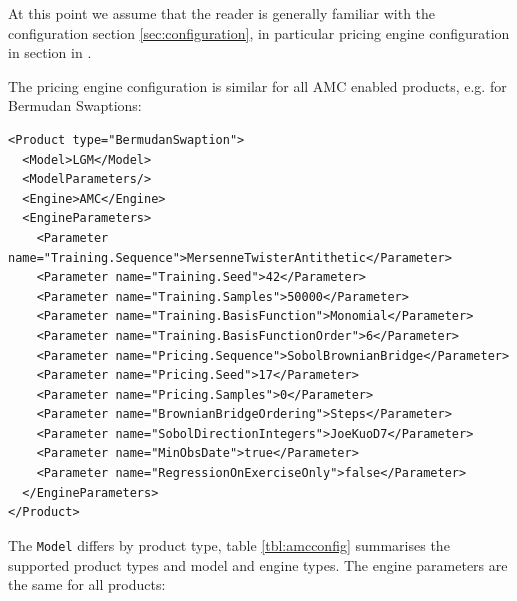 At this point we assume that the reader is generally familiar with the configuration section
\ref{sec:configuration}, in particular pricing engine configuration in section in \cite{products}.

The pricing engine configuration is similar for all AMC enabled products, e.g. for Bermudan Swaptions:

\begin{verbatim}
<Product type="BermudanSwaption">
  <Model>LGM</Model>
  <ModelParameters/>
  <Engine>AMC</Engine>
  <EngineParameters>
    <Parameter name="Training.Sequence">MersenneTwisterAntithetic</Parameter>
    <Parameter name="Training.Seed">42</Parameter>
    <Parameter name="Training.Samples">50000</Parameter>
    <Parameter name="Training.BasisFunction">Monomial</Parameter>
    <Parameter name="Training.BasisFunctionOrder">6</Parameter>
    <Parameter name="Pricing.Sequence">SobolBrownianBridge</Parameter>
    <Parameter name="Pricing.Seed">17</Parameter>
    <Parameter name="Pricing.Samples">0</Parameter>
    <Parameter name="BrownianBridgeOrdering">Steps</Parameter>
    <Parameter name="SobolDirectionIntegers">JoeKuoD7</Parameter>
    <Parameter name="MinObsDate">true</Parameter>
    <Parameter name="RegressionOnExerciseOnly">false</Parameter>
  </EngineParameters>
</Product>
\end{verbatim}

The \verb+Model+ differs by product type, table \ref{tbl:amcconfig} summarises the supported product types and model and
engine types. The engine parameters are the same for all products:

